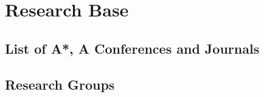 
\section{Research Base}
\label{sec:research base}

\subsection{List of A*, A Conferences and Journals}

\subsection{Research Groups}

